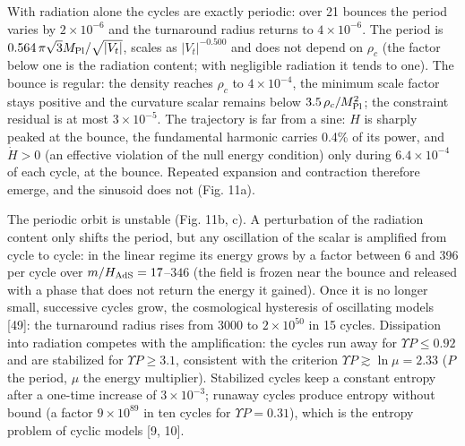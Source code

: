 \documentclass[11pt,a4paper]{article}
\begin{document}
With radiation alone the cycles are exactly periodic: over 21 bounces the period varies by $2\times10^{-6}$ and the turnaround radius returns to $4\times10^{-6}$. The period is $0.564\,\pi\sqrt3M_{\rm Pl}/\sqrt{|V_t|}$, scales as $|V_t|^{-0.500}$ and does not depend on $\rho_c$ (the factor below one is the radiation content; with negligible radiation it tends to one). The bounce is regular: the density reaches $\rho_c$ to $4\times10^{-4}$, the minimum scale factor stays positive and the curvature scalar remains below $3.5\,\rho_c/M_{\rm Pl}^2$; the constraint residual is at most $3\times10^{-5}$. The trajectory is far from a sine: $H$ is sharply peaked at the bounce, the fundamental harmonic carries 0.4\% of its power, and $\dot H>0$ (an effective violation of the null energy condition) only during $6.4\times10^{-4}$ of each cycle, at the bounce. Repeated expansion and contraction therefore emerge, and the sinusoid does not (Fig. 11a).

The periodic orbit is unstable (Fig. 11b, c). A perturbation of the radiation content only shifts the period, but any oscillation of the scalar is amplified from cycle to cycle: in the linear regime its energy grows by a factor between 6 and 396 per cycle over $m/H_{\rm AdS}=17$--$346$ (the field is frozen near the bounce and released with a phase that does not return the energy it gained). Once it is no longer small, successive cycles grow, the cosmological hysteresis of oscillating models [49]: the turnaround radius rises from $3000$ to $2\times10^{50}$ in 15 cycles. Dissipation into radiation competes with the amplification: the cycles run away for $\Upsilon P\le0.92$ and are stabilized for $\Upsilon P\ge3.1$, consistent with the criterion $\Upsilon P\gtrsim\ln\mu=2.33$ ($P$ the period, $\mu$ the energy multiplier). Stabilized cycles keep a constant entropy after a one-time increase of $3\times10^{-3}$; runaway cycles produce entropy without bound (a factor $9\times10^{89}$ in ten cycles for $\Upsilon P=0.31$), which is the entropy problem of cyclic models [9, 10].
\end{document}
